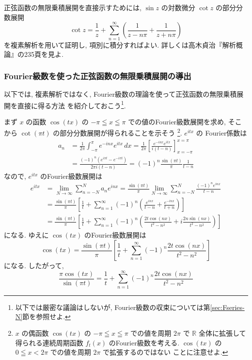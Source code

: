 \documentclass[12pt,twoside]{jarticle}
\newcommand\R{{\mathbb R}} %
\theoremstyle{jplain}
\theoremstyle{jplain}
\theoremstyle{jplain}
\numberwithin{theorem}{section}
\numberwithin{equation}{section}
\numberwithin{figure}{section}
\numberwithin{table}{section}
\newcommand\secref[1]{第\ref{#1}節}
\begin{document}
正弦函数の無限乗積展開を直接示すためには,
$\sin z$ の対数微分 $\cot z$ の部分分数展開
\[
\cot z
= \frac{1}{z}
+ \sum_{n=1}^\infty\left(\frac{1}{z-n\pi}+\frac{1}{z+n\pi}\right)
\]
を複素解析を用いて証明し, 項別に積分すればよい.
詳しくは高木貞治『解析概論』の235頁を見よ.

\subsubsection{Fourier級数を使った正弦函数の無限乗積展開の導出}
\label{sub:prod-sin1}

以下では, 複素解析ではなく,
Fourier級数の理論を使って正弦函数の無限乗積展開を直接に得る方法
を紹介しておこう\footnote{以下では厳密な議論はしないが,
Fourier級数の収束については\secref{sec:Fseries-N}を参照せよ.}.

まず $x$ の函数 $\cos(tx)$ の $-\pi\leqq x\leqq\pi$ での値のFourier級数展開を求め,
そこから $\cot(\pi t)$ の部分分数展開が得られることを示そう%
\footnote{$x$ の偶函数 $\cos(tx)$ の $-\pi\leqq x\leqq\pi$ での値を周期 $2\pi$
で $\R$ 全体に拡張して得られる連続周期函数 $f_t(x)$ のFourier級数を考える.
$\cos(tx)$ の $0\leqq x<2\pi$ での値を周期 $2\pi$ で拡張するのではない
ことに注意せよ.
}.
$e^{itx}$ の Fourier係数は
\begin{align*}
a_n
&= \frac{1}{2\pi}\int_{-\pi}^\pi e^{-inx}e^{itx}\,dx
=\frac{1}{2\pi}\left[ \frac{e^{-inx}e^{itx}}{i(t-n)} \right]_{x=-\pi}^{x=\pi}
\\ &
=\frac{(-1)^n(e^{i\pi t}-e^{-i\pi t})}{2\pi i(t-n)}
=(-1)^n\frac{\sin(\pi t)}{\pi}\frac{1}{t-n}
\end{align*}
なので, $e^{itx}$ のFourier級数展開は
\begin{align*}
e^{itx}
&=\lim_{N\to\infty} \sum_{n=-N}^N a_n e^{inx}
=\frac{\sin(\pi t)}{\pi}
\lim_{N\to\infty} \sum_{n=-N}^N \frac{(-1)^n e^{inx}}{t-n}
\\ &
=\frac{\sin(\pi t)}{\pi} \left[
  \frac{1}{t}
  + \sum_{n=1}^\infty (-1)^n
    \left(\frac{e^{inx}}{t-n}+\frac{e^{-inx}}{t+n} \right)
\right]
\\ &
=\frac{\sin(\pi t)}{\pi} \left[
  \frac{1}{t}
  + \sum_{n=1}^\infty (-1)^n
    \left(\frac{2t\cos(nx)}{t^2-n^2}+i\frac{2n\sin(nx)}{t^2-n^2} \right)
\right]
\end{align*}
になる. ゆえに $\cos(tx)$ のFourier級数展開は
\[
\cos(tx)
=\frac{\sin(\pi t)}{\pi}
\left[
  \frac{1}{t} + \sum_{n=1}^\infty (-1)^n\frac{2t\cos(nx)}{t^2-n^2}
\right]
\]
になる. したがって,
\begin{equation*}
  \frac{\pi\cos(tx)}{\sin(\pi t)}
  =\frac{1}{t} + \sum_{n=1}^\infty (-1)^n\frac{2t\cos(nx)}{t^2-n^2}
\end{equation*}
\end{document}
